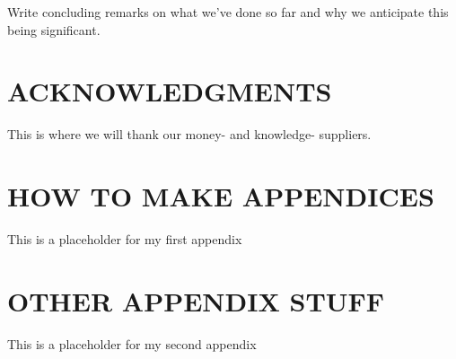 \documentclass[12pt]{article}
\begin{document}
Write concluding remarks on what we've done so far and why we anticipate this being significant. 

%
\section*{ACKNOWLEDGMENTS}

This is where we will thank our money- and knowledge- suppliers. 





\appendix

\makeatletter
\def\@seccntformat#1{APPENDIX \csname the#1\endcsname.~}
\makeatother

\section{HOW TO MAKE APPENDICES}
\label{app::a}

This is a placeholder for my first appendix

\section{OTHER APPENDIX STUFF}
\label{app::b}

This is a placeholder for my second appendix
\end{document}
